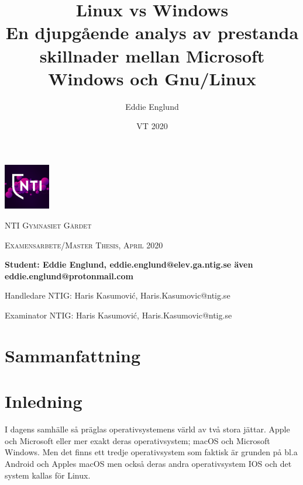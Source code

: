 \documentclass[a4paper, 12pt]{report}
\author{Eddie Englund}
\title{Linux vs Windows\\[0.2em]\smaller{}En djupgående analys av prestanda skillnader mellan Microsoft Windows och Gnu/Linux}
\date{VT 2020}
\begin{document}
\begin{titlepage}

    \maketitle

    \begin{center}

    
        \includegraphics[width=0.15\textwidth]{nti}\par\vspace{1cm}

    {\scshape\LARGE NTI Gymnasiet Gärdet \par}
    \vspace{1cm}
    {\scshape\Large Examensarbete/Master Thesis, April 2020\par}
	\vspace{1.5cm}
    \textbf{
    Student: Eddie Englund, eddie.englund@elev.ga.ntig.se även eddie.englund@protonmail.com}
    \vspace{0.2cm}

    Handledare NTIG: Haris Kasumović, Haris.Kasumovic@ntig.se
    \vspace{0.1cm}

    Examinator NTIG: Haris Kasumović, Haris.Kasumovic@ntig.se
    
    \end{center}
\end{titlepage}


\section{Sammanfattning}\label{sum}

    \begin{abstract}

    \end{abstract}

\tableofcontents



\section{Inledning}


    I dagens samhälle så präglas operativsystemens värld av två stora jättar. Apple och Microsoft eller mer exakt deras operativsystem; macOS och Microsoft Windows. Men det finns ett tredje operativsystem som faktisk är grunden på bl.a Android och Apples macOS men också deras andra operativsystem IOS och det system kallas för Linux.
\end{document}
